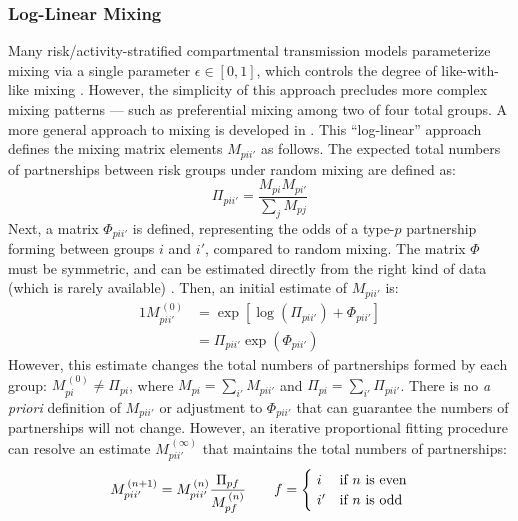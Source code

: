 \subsubsection{Log-Linear Mixing}\label{mod.par.mix.ll}
Many risk/activity-stratified compartmental transmission models
parameterize mixing via a single parameter $\epsilon \in [0,1]$,
which controls the degree of like-with-like mixing \cite{Nold1980,Garnett1994}.
However, the simplicity of this approach precludes more complex mixing patterns
--- such as preferential mixing among two of four total groups.
A more general approach to mixing is developed in \cite{Morris1991ll}.
This ``log-linear'' approach defines the mixing matrix elements $M_{pii'}$ as follows.
The expected total numbers of partnerships between risk groups under random mixing are defined as:
\begin{equation}\label{eq:mix.rand}
  \Pi_{pii'} = \frac{M_{pi} M_{pi'}}{\sum_{j} M_{pj}}
\end{equation}
Next, a matrix $\Phi_{pii'}$ is defined, representing the odds of
a type-$p$ partnership forming between groups $i$ and $i'$, compared to random mixing.
The matrix $\Phi$ must be symmetric,
and can be estimated directly from the right kind of data
(which is rarely available) \cite{Morris1991ll}.
Then, an initial estimate of $M_{pii'}$ is:
\begin{alignat}{1}
  M_{pii'}^{\,(0)} &= \exp{\left[\log{\left(\Pi_{pii'}\right)} + \Phi_{pii'} \right]} \nonumber\\
                 &= \Pi_{pii'} \exp{\left(\Phi_{pii'}\right)} \label{eq:mix.M0}
\end{alignat}
However, this estimate changes the total numbers of partnerships formed by each group:
$M_{pi}^{\,(0)} \ne \Pi_{pi}$, where
$M_{pi} = \sum_{i'} M_{pii'}$ and $\Pi_{pi} = \sum_{i'} \Pi_{pii'}$.
There is no \textit{a priori} definition of $M_{pii'}$ or adjustment to $\Phi_{pii'}$
that can guarantee the numbers of partnerships will not change.
However, an iterative proportional fitting procedure \cite{Ruschendorf1995}
can resolve an estimate $M_{pii'}^{\,(\infty)}$ that maintains the total numbers of partnerships:
\begin{equation}\label{eq:mix.iter}
  M_{pii'}^{\,(n+1)} = M_{pii'}^{\,(n)} \frac{\Pi_{pf}}{M_{pf}^{\,(n)}}
  \qquad f = \begin{cases}
    ~i  & \textnormal{if $n$ is even} \\
    ~i' & \textnormal{if $n$ is odd}
  \end{cases}
\end{equation}
